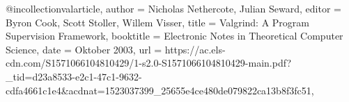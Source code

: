 @incollection{valarticle,
author = {Nicholas Nethercote, Julian Seward},
editor = {Byron Cook, Scott Stoller, Willem Visser},
title = {Valgrind: A Program Supervision Framework},
booktitle = {Electronic Notes in Theoretical Computer Science},
date = {Oktober 2003},
url = {https://ac.els-cdn.com/S1571066104810429/1-s2.0-S1571066104810429-main.pdf?_tid=d23a8533-e2c1-47c1-9632-cdfa4661c1e4&acdnat=1523037399_25655e4ce480de079822ca13b8f3fc51},
}

